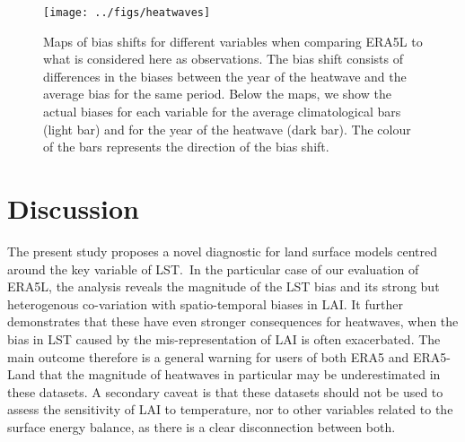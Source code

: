 \documentclass[gmd, manuscript]{copernicus}
\begin{document}
{\par\null{}
\begin{figure}[H]
\begin{center}
\texttt{[image: ../figs/heatwaves]}
\caption{{Maps of bias shifts for different variables when comparing ERA5L to what
is considered here as observations. The bias shift consists of
differences in the biases between the year of the heatwave and the
average bias for the same period. Below the maps, we show the actual
biases for each variable for the average climatological bars (light bar)
and for the year of the heatwave (dark bar). The colour of the bars
represents the direction of the bias shift.
{\label{116908}}%
}}
\end{center}
\end{figure}







\section{Discussion}

The present study proposes a novel diagnostic for land surface models
centred around the key variable of LST.~In the particular case of our
evaluation of ERA5L, the analysis reveals the magnitude of the LST bias
and its strong but heterogenous co-variation with spatio-temporal biases
in LAI. It further demonstrates that these have even stronger
consequences for heatwaves, when the bias in LST caused by the
mis-representation of LAI is often exacerbated. The main outcome
therefore is a general warning for users of both ERA5 and ERA5-Land that
the magnitude of heatwaves in particular may be underestimated in these
datasets. A secondary caveat is that these datasets should not be used
to assess the sensitivity of LAI to temperature, nor to other variables
related to the surface energy balance, as there is a clear disconnection
between both.

}
\end{document}
